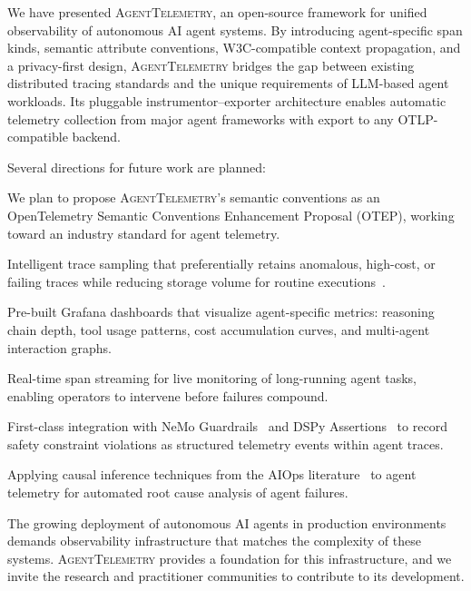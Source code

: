 \documentclass[sigconf,nonacm]{acmart}
\begin{document}
We have presented \textsc{AgentTelemetry}, an open-source framework for
unified observability of autonomous AI agent systems.  By introducing
agent-specific span kinds, semantic attribute conventions, W3C-compatible
context propagation, and a privacy-first design, \textsc{AgentTelemetry}
bridges the gap between existing distributed tracing standards and the
unique requirements of LLM-based agent workloads.  Its pluggable
instrumentor--exporter architecture enables automatic telemetry collection
from major agent frameworks with export to any OTLP-compatible backend.

Several directions for future work are planned:

\begin{description}[leftmargin=*,nosep,style=unboxed]
    \item[Semantic Convention Standardization.]  We plan to propose
        \textsc{AgentTelemetry}'s semantic conventions as an OpenTelemetry
        Semantic Conventions Enhancement Proposal (OTEP), working toward
        an industry standard for agent telemetry.
    \item[Adaptive Sampling.]  Intelligent trace sampling that
        preferentially retains anomalous, high-cost, or failing traces
        while reducing storage volume for routine
        executions~\cite{sieve_sampling}.
    \item[Agent-Aware Dashboards.]  Pre-built Grafana dashboards that
        visualize agent-specific metrics: reasoning chain depth, tool
        usage patterns, cost accumulation curves, and multi-agent
        interaction graphs.
    \item[Streaming Telemetry.]  Real-time span streaming for live
        monitoring of long-running agent tasks, enabling operators to
        intervene before failures compound.
    \item[Safety Integration.]  First-class integration with NeMo
        Guardrails~\cite{nemo_guardrails} and DSPy
        Assertions~\cite{dspy_assertions} to record safety constraint
        violations as structured telemetry events within agent traces.
    \item[Causal Analysis.]  Applying causal inference techniques
        from the AIOps literature~\cite{mulan} to agent telemetry for
        automated root cause analysis of agent failures.
\end{description}

The growing deployment of autonomous AI agents in production environments
demands observability infrastructure that matches the complexity of these
systems.  \textsc{AgentTelemetry} provides a foundation for this
infrastructure, and we invite the research and practitioner communities to
contribute to its development.
\end{document}
